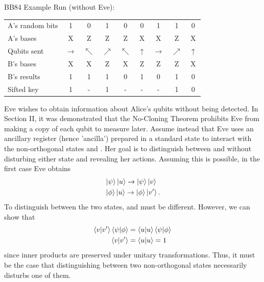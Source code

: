 \documentclass[conference]{IEEEtran}
\begin{document}
BB84 Example Run (without Eve):
\begin{center}
  \begin{tabular}{|l|c c c c c c c c|}
    \hline
    A's random bits & 1 & 0 & 1 & 0 & 0 & 1 & 1 & 0 \\
    A's bases       & X & Z & Z & Z & X & X & Z & X\\
    Qubits sent & $\rightarrow$ & $\nwarrow$ & $\nearrow$ & $\nwarrow$ & $\uparrow$ & $\rightarrow$ & $\nearrow$ & $\uparrow$ \\
    B's bases         & X & X & Z & X & Z & Z & Z & X \\
    B's results       & 1 & 1 & 1 & 0 & 1 & 0 & 1 & 0 \\
    \hline
    Sifted key          & 1 & - & 1 & - & - & - & 1 & 0 \\
    \hline
  \end{tabular}
\end{center}

Eve wishes to obtain information about Alice's qubits without being detected. In Section II, it was demonstrated that the No-Cloning Theorem prohibits Eve from making a copy of each qubit to measure later. Assume instead that Eve uses an ancillary register (hence 'ancilla') prepared in a standard state  to interact with the non-orthogonal states \ket{\psi} and \ket{\phi}. Her goal is to distinguish between \ket{\psi} and \ket{\phi} without disturbing either state and revealing her actions. Assuming this is possible, in the first case Eve obtains
\begin{equation*}
  \begin{split}
    &\left\vert{\psi}\right\rangle\left\vert{u}\right\rangle\rightarrow\left\vert{\psi}\right\rangle\left\vert{v}\right\rangle \\
    &\left\vert{\phi}\right\rangle\left\vert{u}\right\rangle\rightarrow\left\vert{\phi}\right\rangle\left\vert{v'}\right\rangle.
  \end{split}
\end{equation*}
To distinguish between the two states,  and  must be different. However, we can show that
\begin{equation*}
  \begin{split}
    \left\langle{v}\middle\vert{v'}\right\rangle\left\langle{\psi}\middle\vert{\phi}\right\rangle&=\left\langle{u}\middle\vert{u}\right\rangle\left\langle{\psi}\middle\vert{\phi}\right\rangle \\
    \left\langle{v}\middle\vert{v'}\right\rangle&=\left\langle{u}\middle\vert{u}\right\rangle=1
  \end{split}
\end{equation*}
since inner products are preserved under unitary transformations\cite{Nielsen}. Thus, it must be the case that distinguishing between two non-orthogonal states necessarily disturbs one of them.\\
\end{document}
